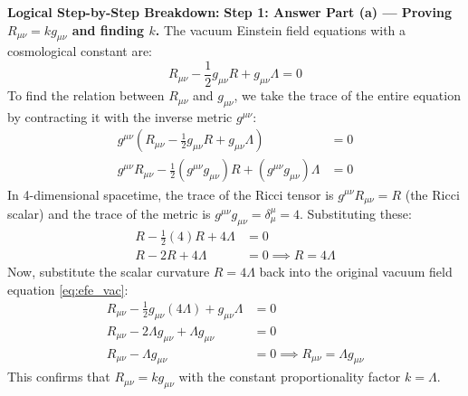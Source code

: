 \begin{solution}
\textbf{Logical Step-by-Step Breakdown:}
\textbf{Step 1: Answer Part (a) --- Proving $R_{\mu\nu} = kg_{\mu\nu}$ and finding $k$.}
The vacuum Einstein field equations with a cosmological constant are:
\begin{equation}
    R_{\mu\nu} - \frac{1}{2} g_{\mu\nu} R + g_{\mu\nu} \Lambda = 0 \label{eq:efe_vac}
\end{equation}
To find the relation between $R_{\mu\nu}$ and $g_{\mu\nu}$, we take the trace of the entire equation by contracting it with the inverse metric $g^{\mu\nu}$:
\begin{align*}
    g^{\mu\nu} \left( R_{\mu\nu} - \frac{1}{2} g_{\mu\nu} R + g_{\mu\nu} \Lambda \right) &= 0 \\
    g^{\mu\nu} R_{\mu\nu} - \frac{1}{2} (g^{\mu\nu} g_{\mu\nu}) R + (g^{\mu\nu} g_{\mu\nu}) \Lambda &= 0
\end{align*}
In 4-dimensional spacetime, the trace of the Ricci tensor is $g^{\mu\nu} R_{\mu\nu} = R$ (the Ricci scalar) and the trace of the metric is $g^{\mu\nu} g_{\mu\nu} = \delta^\mu_\mu = 4$. Substituting these:
\begin{align*}
    R - \frac{1}{2}(4) R + 4\Lambda &= 0 \\
    R - 2R + 4\Lambda &= 0 \implies R = 4\Lambda
\end{align*}
Now, substitute the scalar curvature $R = 4\Lambda$ back into the original vacuum field equation \eqref{eq:efe_vac}:
\begin{align*}
    R_{\mu\nu} - \frac{1}{2} g_{\mu\nu} (4\Lambda) + g_{\mu\nu} \Lambda &= 0 \\
    R_{\mu\nu} - 2\Lambda g_{\mu\nu} + \Lambda g_{\mu\nu} &= 0 \\
    R_{\mu\nu} - \Lambda g_{\mu\nu} &= 0 \implies R_{\mu\nu} = \Lambda g_{\mu\nu}
\end{align*}
This confirms that $R_{\mu\nu} = k g_{\mu\nu}$ with the constant proportionality factor \textbf{$k = \Lambda$}.


\end{solution}
